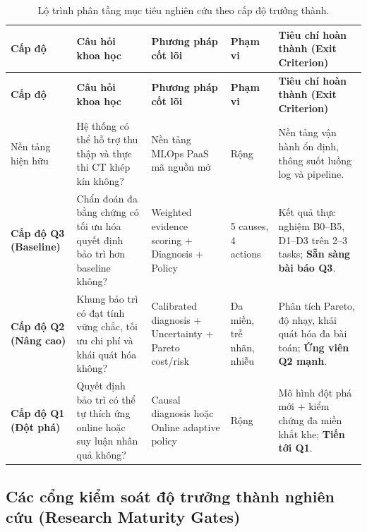 \begin{xltabular}{\linewidth}{@{}L{2.0cm} L{3.6cm} L{3.8cm} C{1.6cm} Y@{}}
\caption{Lộ trình phân tầng mục tiêu nghiên cứu theo cấp độ trưởng thành.}\label{tab:roadmap-levels}\\
\toprule
\textbf{Cấp độ} & \textbf{Câu hỏi khoa học} & \textbf{Phương pháp cốt lõi} & \textbf{Phạm vi} & \textbf{Tiêu chí hoàn thành (Exit Criterion)} \\
\midrule
\endfirsthead
\toprule
\textbf{Cấp độ} & \textbf{Câu hỏi khoa học} & \textbf{Phương pháp cốt lõi} & \textbf{Phạm vi} & \textbf{Tiêu chí hoàn thành (Exit Criterion)} \\
\midrule
\endhead

Nền tảng hiện hữu & Hệ thống có thể hỗ trợ thu thập và thực thi CT khép kín không? & Nền tảng MLOps PaaS mã nguồn mở & Rộng & Nền tảng vận hành ổn định, thông suốt luồng log và pipeline. \\
\addlinespace

\textbf{Cấp độ Q3 (Baseline)} & Chẩn đoán đa bằng chứng có tối ưu hóa quyết định bảo trì hơn baseline không? & Weighted evidence scoring + Diagnosis + Policy & 5 causes, 4 actions & Kết quả thực nghiệm B0--B5, D1--D3 trên 2--3 tasks; \textbf{Sẵn sàng bài báo Q3}. \\
\addlinespace

\textbf{Cấp độ Q2 (Nâng cao)} & Khung bảo trì có đạt tính vững chắc, tối ưu chi phí và khái quát hóa không? & Calibrated diagnosis + Uncertainty + Pareto cost/risk & Đa miền, trễ nhãn, nhiễu & Phân tích Pareto, độ nhạy, khái quát hóa đa bài toán; \textbf{Ứng viên Q2 mạnh}. \\
\addlinespace

\textbf{Cấp độ Q1 (Đột phá)} & Quyết định bảo trì có thể tự thích ứng online hoặc suy luận nhân quả không? & Causal diagnosis hoặc Online adaptive policy & Rộng & Mô hình đột phá mới + kiểm chứng đa miền khắt khe; \textbf{Tiến tới Q1}. \\
\bottomrule
\end{xltabular}

\subsection{Các cổng kiểm soát độ trưởng thành nghiên cứu (Research Maturity Gates)}

